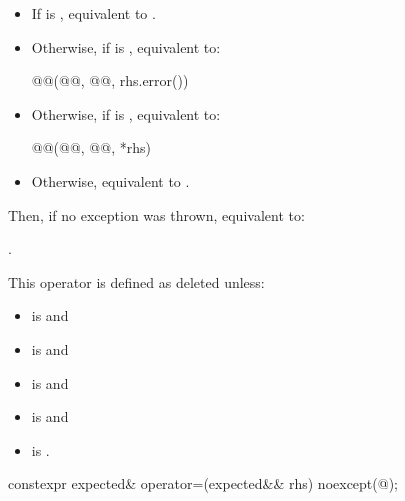 \begin{itemdescr}
\pnum
\effects
\begin{itemize}
\item
If  is ,
equivalent to .
\item
Otherwise, if  is , equivalent to:
\begin{codeblock}
@@(@@, @@, rhs.error())
\end{codeblock}
\item
Otherwise, if  is , equivalent to:
\begin{codeblock}
@@(@@, @@, *rhs)
\end{codeblock}
\item
Otherwise, equivalent to .
\end{itemize}
Then, if no exception was thrown,
equivalent to: 

\pnum
\returns
{}.

\pnum
\remarks
This operator is defined as deleted unless:
\begin{itemize}
\item
{} is  and
\item
{} is  and
\item
{} is  and
\item
{} is  and
\item
{}
is .
\end{itemize}
\end{itemdescr}

%
\begin{itemdecl}
constexpr expected& operator=(expected&& rhs) noexcept(@\seebelow@);
\end{itemdecl}

